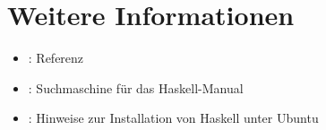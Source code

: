 \section{Weitere Informationen}
\begin{itemize}
    \item \href{http://hackage.haskell.org/package/base-4.6.0.1}{}: Referenz
    \item \href{http://www.haskell.org/hoogle/}{}: Suchmaschine für das Haskell-Manual
    \item \href{http://wiki.ubuntuusers.de/Haskell}{}: Hinweise zur Installation von Haskell unter Ubuntu
\end{itemize}


